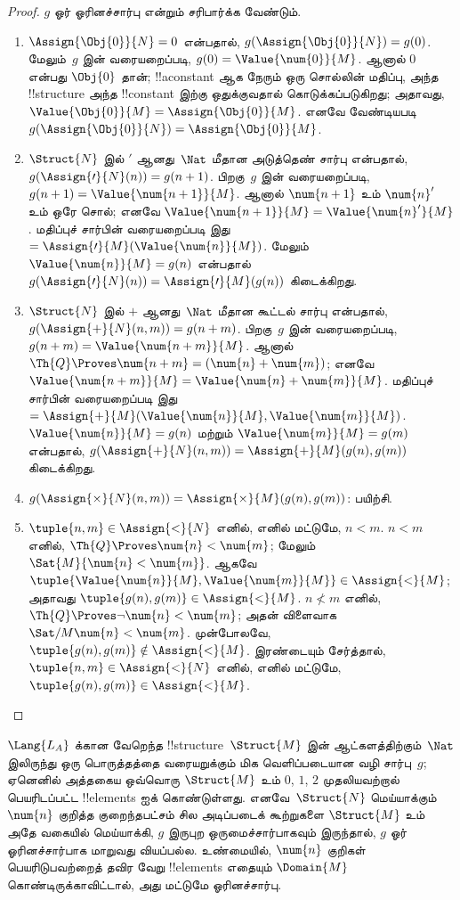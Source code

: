 \documentclass[../../../include/open-logic-section]{subfiles}
\begin{document}
\begin{proof}
$g$ ஓர் ஓரினச்சார்பு என்றும் சரிபார்க்க வேண்டும்.
\begin{enumerate}
\item $\Assign{\Obj{0}}{N} = 0$ என்பதால்,
  $g(\Assign{\Obj{0}}{N}) = g(0)$. மேலும்~$g$ இன் வரையறைப்படி,
  $g(0) =
  \Value{\num{0}}{M}$. ஆனால் $\num{0}$ என்பது $\Obj{0}$ தான்;
  !!a{constant} ஆக நேரும் ஒரு சொல்லின் மதிப்பு, அந்த !!{structure}
  அந்த !!{constant} இற்கு ஒதுக்குவதால் கொடுக்கப்படுகிறது; அதாவது,
  $\Value{\Obj{0}}{M} = \Assign{\Obj{0}}{M}$. எனவே வேண்டியபடி
  $g(\Assign{\Obj{0}}{N}) = \Assign{\Obj{0}}{M}$.
\item $\Struct{N}$ இல் $\prime$ ஆனது~$\Nat$ மீதான அடுத்தெண் சார்பு
  என்பதால், $g(\Assign{\prime}{N}(n)) = g(n+1)$. பிறகு~$g$ இன்
  வரையறைப்படி, $g(n+1) =
  \Value{\num{n+1}}{M}$. ஆனால் $\num{n+1}$ உம் $\num{n}'$ உம் ஒரே
  சொல்; எனவே $\Value{\num{n+1}}{M} =
  \Value{\num{n}'}{M}$. மதிப்புச் சார்பின் வரையறைப்படி இது
  $= \Assign{\prime}{M}(\Value{\num{n}}{M})$. மேலும்
  $\Value{\num{n}}{M} = g(n)$ என்பதால்
  $g(\Assign{\prime}{N}(n)) =
  \Assign{\prime}{M}(g(n))$ கிடைக்கிறது.
\item $\Struct{N}$ இல் $+$ ஆனது~$\Nat$ மீதான கூட்டல் சார்பு என்பதால்,
  $g(\Assign{+}{N}(n,m)) = g(n+m)$. பிறகு~$g$ இன் வரையறைப்படி,
  $g(n+m) =
  \Value{\num{n+m}}{M}$. ஆனால் $\Th{Q} \Proves
  \num{n+m} = (\num{n} + \num{m})$; எனவே
  $\Value{\num{n+m}}{M} =
  \Value{\num{n}+\num{m}}{M}$. மதிப்புச் சார்பின் வரையறைப்படி இது
  $=
  \Assign{+}{M}(\Value{\num{n}}{M},\Value{\num{m}}{M})$.
  $\Value{\num{n}}{M} = g(n)$ மற்றும் $\Value{\num{m}}{M} = g(m)$
  என்பதால், $g(\Assign{+}{N}(n, m)) =
  \Assign{+}{M}(g(n), g(m))$ கிடைக்கிறது.
\item $g(\Assign{\times}{N}(n, m)) =
  \Assign{\times}{M}(g(n), g(m))$: பயிற்சி.
\item $\tuple{n,m} \in \Assign{<}{N}$ எனில், எனில் மட்டுமே,
  $n < m$. $n < m$ எனில், $\Th{Q} \Proves \num{n} < \num{m}$;
  மேலும் $\Sat{M}{\num{n} <
  \num{m}}$. ஆகவே
  $\tuple{\Value{\num{n}}{M}, \Value{\num{m}}{M}} \in
  \Assign{<}{M}$; அதாவது $\tuple{g(n), g(m)} \in \Assign{<}{M}$.
  $n
  \not< m$ எனில், $\Th{Q} \Proves \lnot \num{n} < \num{m}$;
  அதன் விளைவாக $\Sat/{M}{\num{n} < \num{m}}$. முன்போலவே,
  $\tuple{g(n), g(m)} \notin \Assign{<}{M}$. இரண்டையும் சேர்த்தால்,
  $\tuple{n,m} \in \Assign{<}{N}$ எனில், எனில் மட்டுமே,
  $\tuple{g(n), g(m)} \in
  \Assign{<}{M}$.
\end{enumerate}
\end{proof}

\begin{explain}
$\Lang{L_A}$ க்கான வேறெந்த !!{structure}~$\Struct{M}$ இன்
ஆட்களத்திற்கும்~$\Nat$ இலிருந்து ஒரு பொருத்தத்தை வரையறுக்கும் மிக
வெளிப்படையான வழி சார்பு~$g$; ஏனெனில் அத்தகைய ஒவ்வொரு $\Struct{M}$ உம்
$\num{0}$, $\num{1}$, $\num{2}$ முதலியவற்றால் பெயரிடப்பட்ட
!!{element}s ஐக் கொண்டுள்ளது. எனவே~$\Struct{N}$ மெய்யாக்கும்
$\num{n}$ குறித்த குறைந்தபட்சம் சில அடிப்படைக் கூற்றுகளை
$\Struct{M}$ உம் அதே வகையில் மெய்யாக்கி, $g$ இருபுற ஒருமைச்சார்பாகவும்
இருந்தால், $g$ ஓர் ஓரினச்சார்பாக மாறுவது வியப்பல்ல. உண்மையில்,
$\num{n}$ குறிகள் பெயரிடுபவற்றைத் தவிர வேறு !!{element}s எதையும்
$\Domain{M}$ கொண்டிருக்காவிட்டால், அது மட்டுமே ஓரினச்சார்பு.
\end{explain}
\end{document}
